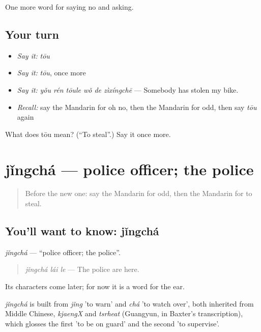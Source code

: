 \begin{grammarlens}[title={What you've built}]
One more word for saying no and asking.
\end{grammarlens}

\subsection*{Your turn}
\begin{itemize}
\raggedright
  \item \emph{Say it:} \emph{tōu}
  \item \emph{Say it:} \emph{tōu}, once more
  \item \emph{Say it:} \emph{yǒu rén tōule wǒ de zìxíngchē} — Somebody has stolen my bike.
  \item \emph{Recall:} say the Mandarin for oh no, then the Mandarin for odd, then say \emph{tōu} again
\end{itemize}

\begin{tcolorbox}[breakable,colback=teal!4,colframe=teal!35!black,title={Before you move on}]
What does tōu mean? (\textquotedblleft{}To steal\textquotedblright{}.) Say it once more.
\end{tcolorbox}
\section[jǐngchá]{jǐngchá — police officer; the police}

\label{lesson:ZH-C216-jingcha}



\begin{quote}
Before the new one: say the Mandarin for odd, then the Mandarin for to steal.
\end{quote}

\subsection*{You'll want to know: jǐngchá}
\emph{jǐngchá} — \textquotedblleft{}police officer; the police\textquotedblright{}.

\begin{quote}
\emph{jǐngchá lái le} — The police are here.
\end{quote}

Its characters come later; for now it is a word for the ear.

\begin{cousinweb}
\emph{jǐngchá} is built from \emph{jǐng} 'to warn' and \emph{chá} 'to watch over', both inherited from Middle Chinese, \emph{kjaengX} and \emph{tsrheat} (Guangyun, in Baxter's transcription), which glosses the first 'to be on guard' and the second 'to supervise'.
\end{cousinweb}

